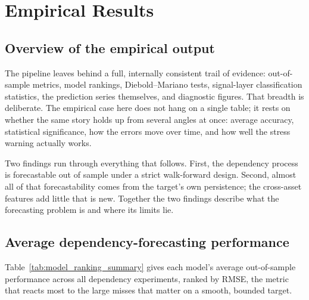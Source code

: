 \section{Empirical Results}

\subsection{Overview of the empirical output}
\label{sec:results_overview}

The pipeline leaves behind a full, internally consistent trail of evidence: out-of-sample metrics, model rankings, Diebold--Mariano tests, signal-layer classification statistics, the prediction series themselves, and diagnostic figures. That breadth is deliberate. The empirical case here does not hang on a single table; it rests on whether the same story holds up from several angles at once: average accuracy, statistical significance, how the errors move over time, and how well the stress warning actually works.

Two findings run through everything that follows. First, the dependency process is forecastable out of sample under a strict walk-forward design. Second, almost all of that forecastability comes from the target's own persistence; the cross-asset features add little that is new. Together the two findings describe what the forecasting problem is and where its limits lie.

\subsection{Average dependency-forecasting performance}

Table~\ref{tab:model_ranking_summary} gives each model's average out-of-sample performance across all dependency experiments, ranked by RMSE, the metric that reacts most to the large misses that matter on a smooth, bounded target.

